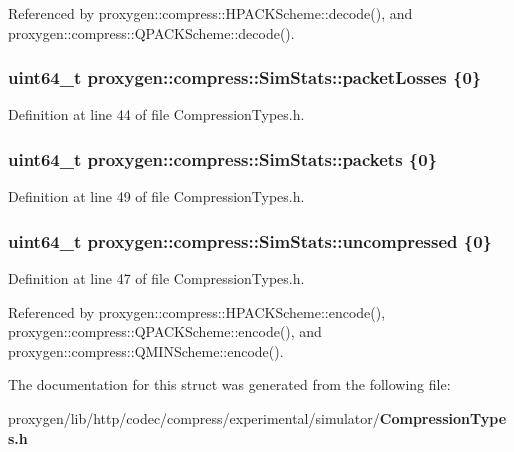 Referenced by proxygen\+::compress\+::\+H\+P\+A\+C\+K\+Scheme\+::decode(), and proxygen\+::compress\+::\+Q\+P\+A\+C\+K\+Scheme\+::decode().

\subsubsection[{packet\+Losses}]{\setlength{\rightskip}{0pt plus 5cm}uint64\+\_\+t proxygen\+::compress\+::\+Sim\+Stats\+::packet\+Losses \{0\}}\label{structproxygen_1_1compress_1_1SimStats_a7985f6c5121e808734cf9c10d8516c24}


Definition at line 44 of file Compression\+Types.\+h.

\subsubsection[{packets}]{\setlength{\rightskip}{0pt plus 5cm}uint64\+\_\+t proxygen\+::compress\+::\+Sim\+Stats\+::packets \{0\}}\label{structproxygen_1_1compress_1_1SimStats_ab2e8dceeec812bc692731823c9599813}


Definition at line 49 of file Compression\+Types.\+h.

\subsubsection[{uncompressed}]{\setlength{\rightskip}{0pt plus 5cm}uint64\+\_\+t proxygen\+::compress\+::\+Sim\+Stats\+::uncompressed \{0\}}\label{structproxygen_1_1compress_1_1SimStats_a5e6232fed235cd5c07f867cc03162607}


Definition at line 47 of file Compression\+Types.\+h.



Referenced by proxygen\+::compress\+::\+H\+P\+A\+C\+K\+Scheme\+::encode(), proxygen\+::compress\+::\+Q\+P\+A\+C\+K\+Scheme\+::encode(), and proxygen\+::compress\+::\+Q\+M\+I\+N\+Scheme\+::encode().



The documentation for this struct was generated from the following file\+:\begin{DoxyCompactItemize}
\item 
proxygen/lib/http/codec/compress/experimental/simulator/{\bf Compression\+Types.\+h}\end{DoxyCompactItemize}
